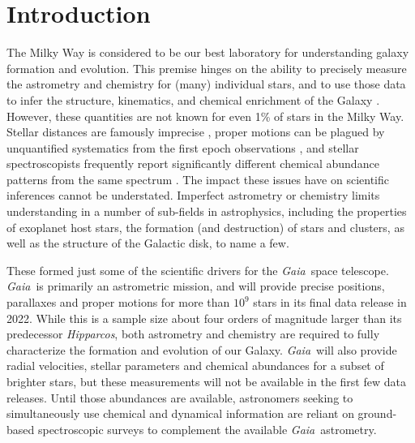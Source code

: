 \documentclass[preprint,trackchanges]{aastex}
\newcommand{\project}[1]{\textsl{#1}}
\newcommand{\gaia}{\project{Gaia}}
\newcommand{\hipparcos}{\project{Hipparcos}}
\begin{document}
\section{Introduction} 
\label{sec:introduction}

The Milky Way is considered to be our best laboratory for understanding galaxy
formation and evolution.  This premise hinges on the ability to precisely measure 
the astrometry and chemistry for (many) individual stars, and to use those data 
to infer the structure, kinematics, and chemical enrichment of the Galaxy 
\citep[e.g.,][]{Schlaufman_2009,Deason_2011,Ness_2012,Ness_2013a,Ness_2013b,
Casey_2012,Casey_2013,Casey_2014a,Casey_2014b,Kordopatis_2015,Bovy_2016}.  
However, these quantities are not known for even 1\% of stars in the Milky Way.  
Stellar distances are famously imprecise \citep[e.g.,][]{van_Leeuwen_2007,
Jofre_2015,Madler_2016}, proper motions can be plagued by unquantified systematics 
from the first epoch observations \citep[e.g.,][]{Casey_Schlaufman_2015}, and 
stellar spectroscopists frequently report significantly different chemical 
abundance patterns from the same spectrum \citep{Smiljanic_2014}.  The impact 
these issues have on scientific inferences cannot be understated.  Imperfect 
astrometry or chemistry limits understanding in a number of sub-fields in
astrophysics, including the properties of exoplanet host stars, the formation 
(and destruction) of stars and clusters, as well as the structure of the 
Galactic disk, to name a few.


These formed just some of the scientific drivers for the \gaia\ space telescope.
\gaia\ is primarily an astrometric mission, and will provide precise positions,
parallaxes and proper motions for more than $10^9$ stars in its final data
release in 2022.  While this is a sample size about four orders of magnitude 
larger than its predecessor \hipparcos, both astrometry and chemistry are 
required to fully characterize the formation and evolution of our Galaxy. 
\gaia\ will also provide radial velocities, stellar parameters and chemical 
abundances for a subset of brighter stars, but these measurements will not be 
available in the first few data releases. Until those abundances are available,
astronomers seeking to simultaneously use chemical and dynamical information are
reliant on ground-based spectroscopic surveys to complement the available 
\gaia\ astrometry.
\end{document}
